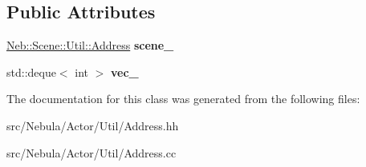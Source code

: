 \subsection*{\-Public \-Attributes}
\begin{DoxyCompactItemize}
\item 
\hypertarget{classNeb_1_1Actor_1_1Util_1_1Address_a4b757419781a7ed7804556d50beee5cf}{\hyperlink{classNeb_1_1Scene_1_1Util_1_1Address}{\-Neb\-::\-Scene\-::\-Util\-::\-Address} {\bfseries scene\-\_\-}}\label{classNeb_1_1Actor_1_1Util_1_1Address_a4b757419781a7ed7804556d50beee5cf}

\item 
\hypertarget{classNeb_1_1Actor_1_1Util_1_1Address_aa9d6e45cf09caf8475a2ee6b6c79892b}{std\-::deque$<$ int $>$ {\bfseries vec\-\_\-}}\label{classNeb_1_1Actor_1_1Util_1_1Address_aa9d6e45cf09caf8475a2ee6b6c79892b}

\end{DoxyCompactItemize}


\-The documentation for this class was generated from the following files\-:\begin{DoxyCompactItemize}
\item 
src/\-Nebula/\-Actor/\-Util/\-Address.\-hh\item 
src/\-Nebula/\-Actor/\-Util/\-Address.\-cc\end{DoxyCompactItemize}
